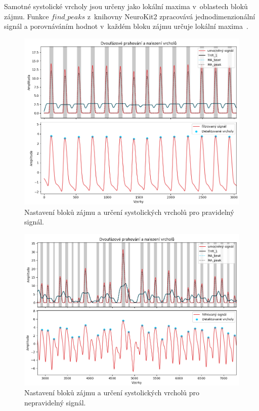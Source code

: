 Samotné systolické vrcholy jsou určeny jako lokální maxima v~oblastech bloků zájmu.
Funkce \(find\_peaks\) z~knihovny NeuroKit2 zpracovává jednodimenzionální signál a porovnáváním hodnot v~každém bloku zájmu určuje lokální maxima~\cite{NeuroKit2}.

\begin{figure}[t]
	\vspace{-9mm}
	\centering
	\includegraphics[width=1\textwidth]{./obrazky/Elgendi_THR_Peaks_Clean.png}
	\vspace{-9mm}
	\caption[Elgendiho zpracování pravidelného signálu]{Nastavení bloků zájmu a určení systolických vrcholů pro pravidelný signál.}
	\label{fig:thresholds_peaks_clean}
\end{figure}

\begin{figure}[b]
	\centering
	\vspace{-10mm}
	\includegraphics[width=1\textwidth]{./obrazky/Elgendi_THR_Peaks.png}
	\caption[Elgendiho zpracování nepravidelného signálu]{Nastavení bloků zájmu a určení systolických vrcholů pro nepravidelný signál.}
	\vspace{-15mm}
	\label{fig:thresholds_peaks}
\end{figure}